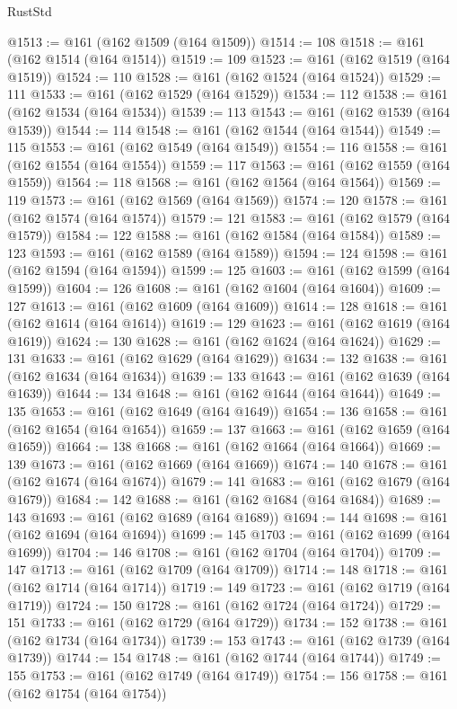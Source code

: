 \begin{lexlean}{RustStd}
\begin{coremodule}
@1513 := @161 (@162 @1509 (@164 @1509))
@1514 := 108
@1518 := @161 (@162 @1514 (@164 @1514))
@1519 := 109
@1523 := @161 (@162 @1519 (@164 @1519))
@1524 := 110
@1528 := @161 (@162 @1524 (@164 @1524))
@1529 := 111
@1533 := @161 (@162 @1529 (@164 @1529))
@1534 := 112
@1538 := @161 (@162 @1534 (@164 @1534))
@1539 := 113
@1543 := @161 (@162 @1539 (@164 @1539))
@1544 := 114
@1548 := @161 (@162 @1544 (@164 @1544))
@1549 := 115
@1553 := @161 (@162 @1549 (@164 @1549))
@1554 := 116
@1558 := @161 (@162 @1554 (@164 @1554))
@1559 := 117
@1563 := @161 (@162 @1559 (@164 @1559))
@1564 := 118
@1568 := @161 (@162 @1564 (@164 @1564))
@1569 := 119
@1573 := @161 (@162 @1569 (@164 @1569))
@1574 := 120
@1578 := @161 (@162 @1574 (@164 @1574))
@1579 := 121
@1583 := @161 (@162 @1579 (@164 @1579))
@1584 := 122
@1588 := @161 (@162 @1584 (@164 @1584))
@1589 := 123
@1593 := @161 (@162 @1589 (@164 @1589))
@1594 := 124
@1598 := @161 (@162 @1594 (@164 @1594))
@1599 := 125
@1603 := @161 (@162 @1599 (@164 @1599))
@1604 := 126
@1608 := @161 (@162 @1604 (@164 @1604))
@1609 := 127
@1613 := @161 (@162 @1609 (@164 @1609))
@1614 := 128
@1618 := @161 (@162 @1614 (@164 @1614))
@1619 := 129
@1623 := @161 (@162 @1619 (@164 @1619))
@1624 := 130
@1628 := @161 (@162 @1624 (@164 @1624))
@1629 := 131
@1633 := @161 (@162 @1629 (@164 @1629))
@1634 := 132
@1638 := @161 (@162 @1634 (@164 @1634))
@1639 := 133
@1643 := @161 (@162 @1639 (@164 @1639))
@1644 := 134
@1648 := @161 (@162 @1644 (@164 @1644))
@1649 := 135
@1653 := @161 (@162 @1649 (@164 @1649))
@1654 := 136
@1658 := @161 (@162 @1654 (@164 @1654))
@1659 := 137
@1663 := @161 (@162 @1659 (@164 @1659))
@1664 := 138
@1668 := @161 (@162 @1664 (@164 @1664))
@1669 := 139
@1673 := @161 (@162 @1669 (@164 @1669))
@1674 := 140
@1678 := @161 (@162 @1674 (@164 @1674))
@1679 := 141
@1683 := @161 (@162 @1679 (@164 @1679))
@1684 := 142
@1688 := @161 (@162 @1684 (@164 @1684))
@1689 := 143
@1693 := @161 (@162 @1689 (@164 @1689))
@1694 := 144
@1698 := @161 (@162 @1694 (@164 @1694))
@1699 := 145
@1703 := @161 (@162 @1699 (@164 @1699))
@1704 := 146
@1708 := @161 (@162 @1704 (@164 @1704))
@1709 := 147
@1713 := @161 (@162 @1709 (@164 @1709))
@1714 := 148
@1718 := @161 (@162 @1714 (@164 @1714))
@1719 := 149
@1723 := @161 (@162 @1719 (@164 @1719))
@1724 := 150
@1728 := @161 (@162 @1724 (@164 @1724))
@1729 := 151
@1733 := @161 (@162 @1729 (@164 @1729))
@1734 := 152
@1738 := @161 (@162 @1734 (@164 @1734))
@1739 := 153
@1743 := @161 (@162 @1739 (@164 @1739))
@1744 := 154
@1748 := @161 (@162 @1744 (@164 @1744))
@1749 := 155
@1753 := @161 (@162 @1749 (@164 @1749))
@1754 := 156
@1758 := @161 (@162 @1754 (@164 @1754))

\end{coremodule}
\end{lexlean}
